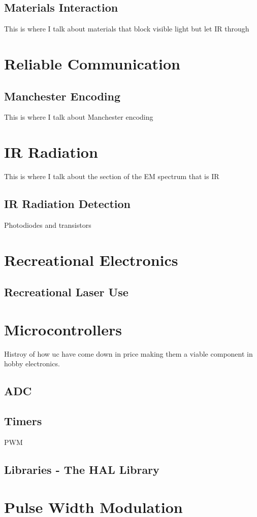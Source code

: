 \subsection{Materials Interaction}
This is where I talk about materials that block visible light but let IR through


\section{Reliable Communication}

\subsection{Manchester Encoding}
This is where I talk about Manchester encoding



\section{IR Radiation}
This is where I talk about the section of the EM spectrum that is IR


\subsection{IR Radiation Detection}

Photodiodes and transistors





\section{Recreational Electronics}


\subsection{Recreational Laser Use}

\section{Microcontrollers}
Histroy of how uc have come down in price making them a viable component in hobby electronics.

\subsection{ADC}

\subsection{Timers}
PWM

\subsection{Libraries - The HAL Library}



\section{Pulse Width Modulation}







